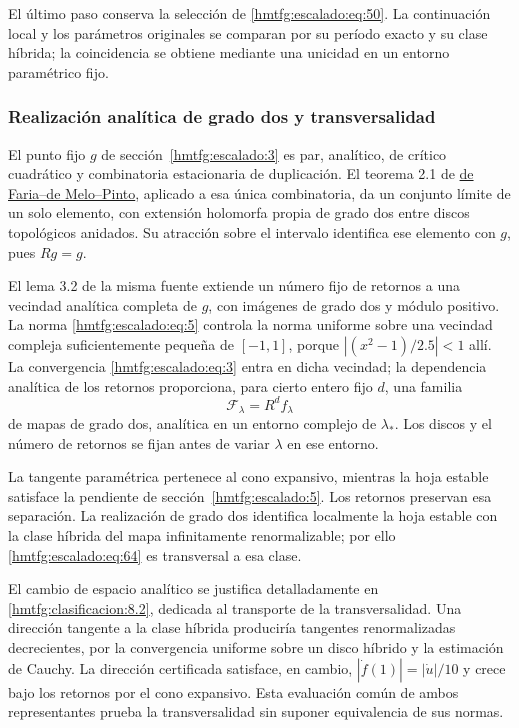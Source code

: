 El último paso conserva la selección de \eqref{hmtfg:escalado:eq:50}. La continuación local y los parámetros originales se comparan por su período exacto y su clase híbrida; la coincidencia se obtiene mediante una unicidad en un entorno paramétrico fijo.

\subsubsection{Realización analítica de grado dos y transversalidad}
\label{hmtfg:escalado:17.1}

El punto fijo \(g\) de sección~\ref{hmtfg:escalado:3} es par, analítico, de crítico cuadrático y combinatoria estacionaria de duplicación. El teorema 2.1 de \href{https://annals.math.princeton.edu/wp-content/uploads/annals-v164-n3-p01.pdf}{de Faria–de Melo–Pinto}, aplicado a esa única combinatoria, da un conjunto límite de un solo elemento, con extensión holomorfa propia de grado dos entre discos topológicos anidados. Su atracción sobre el intervalo identifica ese elemento con \(g\), pues \(Rg=g\).

El lema 3.2 de la misma fuente extiende un número fijo de retornos a una vecindad analítica completa de \(g\), con imágenes de grado dos y módulo positivo. La norma \eqref{hmtfg:escalado:eq:5} controla la norma uniforme sobre una vecindad compleja suficientemente pequeña de \([-1,1]\), porque \(|(x^2-1)/2.5|<1\) allí. La convergencia \eqref{hmtfg:escalado:eq:3} entra en dicha vecindad; la dependencia analítica de los retornos proporciona, para cierto entero fijo \(d\), una familia
\begin{equation}
\mathcal F_\lambda=R^d f_\lambda
\label{hmtfg:escalado:eq:64}
\end{equation}
de mapas de grado dos, analítica en un entorno complejo de \(\lambda_*\). Los discos y el número de retornos se fijan antes de variar \(\lambda\) en ese entorno.

La tangente paramétrica pertenece al cono expansivo, mientras la hoja estable satisface la pendiente de sección~\ref{hmtfg:escalado:5}. Los retornos preservan esa separación. La realización de grado dos identifica localmente la hoja estable con la clase híbrida del mapa infinitamente renormalizable; por ello \eqref{hmtfg:escalado:eq:64} es transversal a esa clase.

El cambio de espacio analítico se justifica detalladamente en \ref{hmtfg:clasificacion:8.2}, dedicada al transporte de la transversalidad. Una dirección tangente a la clase híbrida produciría tangentes renormalizadas decrecientes, por la convergencia uniforme sobre un disco híbrido y la estimación de Cauchy. La dirección certificada satisface, en cambio, \(|\dot f(1)|=|\dot u|/10\) y crece bajo los retornos por el cono expansivo. Esta evaluación común de ambos representantes prueba la transversalidad sin suponer equivalencia de sus normas.

